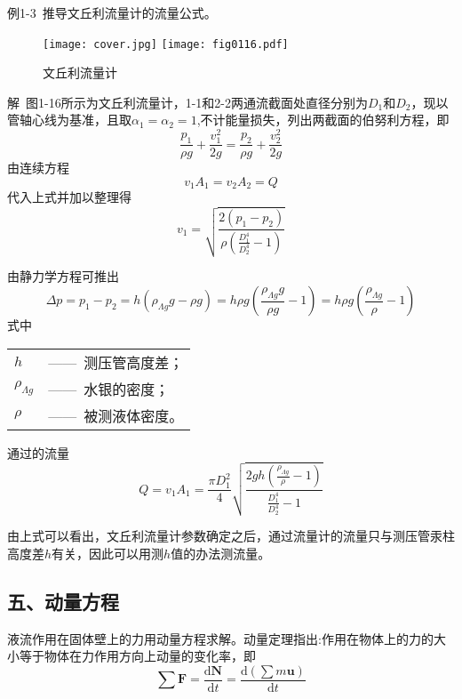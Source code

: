 例1-3\ 推导文丘利流量计的流量公式。

\begin{figure}
  \centering
  \ifOpenSource
  \texttt{[image: cover.jpg]}   
  \else
  \texttt{[image: fig0116.pdf]}
  \fi
  \caption{文丘利流量计}
  \label{fig:fig0116}
  \end{figure}

解\ 图1-16所示为文丘利流量计，1-1和2-2两通流截面处直径分别为$D_1$和$D_2$，现以管轴心线为基准，且取$\alpha_1=\alpha_2=1$,不计能量损失，列出两截面的伯努利方程，即
\begin{equation*}
    \frac{p_1}{\rho g}+\frac{v_1^2}{2g}=\frac{p_2}{\rho g}+\frac{v_2^2}{2g}
\end{equation*}
由连续方程
\begin{equation*}
  v_1A_1=v_2A_2=Q
  \end{equation*}
代入上式并加以整理得
\begin{equation*}
  v_1=\sqrt{\frac{2(p_1-p_2)}{\rho(\frac{D_1^4}{D_2^4}-1)}}
  \end{equation*}

  由静力学方程可推出
  \begin{equation*}
   \Delta p=p_1-p_2=h(\rho_{\Lambda g} g-\rho g)=h\rho g(\frac{\rho_{\Lambda g} g}{\rho g}-1)=h\rho g(\frac{\rho_{\Lambda g}}{\rho}-1)
    \end{equation*}
\noindent 式中\
\begin{tabular}[t]{ll}
$h$&——\ 测压管高度差；\\
$\rho_{\Lambda g}$&——\ 水银的密度；\\
$\rho$&——\ 被测液体密度。
\end{tabular}

通过的流量
\begin{equation*}
Q=v_1A_1=\frac{\pi D_1^2}{4}\sqrt{\frac{2gh(\frac{\rho_{\Lambda g}}{\rho}-1)}{\frac{D_1^4}{D_2^4}-1}}
\end{equation*}

由上式可以看出，文丘利流量计参数确定之后，通过流量计的流量只与测压管汞柱高度差$h$有关，因此可以用测$h$值的办法测流量。
\subsection*{五、动量方程}
液流作用在固体壁上的力用动量方程求解。动量定理指出:作用在物体上的力的大小等于物体在力作用方向上动量的变化率，即
\begin{equation*}
\sum\boldsymbol F=\frac{\mathrm{d}\boldsymbol N}{\mathrm{d}t}=\frac{\mathrm{d}(\sum m \boldsymbol u)}{\mathrm{d}t}
\end{equation*}

